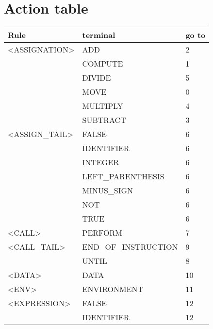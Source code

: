 \newpage\cleardoublepage{}
\section{Action table}
\label{app:action table}



\begin{longtable}{|l|l|l|}

\hline

\textbf{Rule}        &   \textbf{terminal}    &   \textbf{go to} \\ \hline 
<ASSIGNATION>        &   ADD                  &   2 \\ \hline
                     &   COMPUTE              &   1 \\ \hline
                     &   DIVIDE               &   5 \\ \hline
                     &   MOVE                 &   0 \\ \hline
                     &   MULTIPLY             &   4 \\ \hline
                     &   SUBTRACT             &   3 \\ \hline
<ASSIGN\_TAIL>       &   FALSE                &   6 \\ \hline
                     &   IDENTIFIER           &   6 \\ \hline
                     &   INTEGER              &   6 \\ \hline
                     &   LEFT\_PARENTHESIS     &   6 \\ \hline
                     &   MINUS\_SIGN           &   6 \\ \hline
                     &   NOT                  &   6 \\ \hline
                     &   TRUE                 &   6 \\ \hline
<CALL>               &   PERFORM              &   7 \\ \hline
<CALL\_TAIL>         &   END\_OF\_INSTRUCTION   &   9 \\ \hline
                     &   UNTIL                &   8 \\ \hline
<DATA>               &   DATA                 &   10 \\ \hline
<ENV>                &   ENVIRONMENT          &   11 \\ \hline
<EXPRESSION>         &   FALSE                &   12 \\ \hline
                     &   IDENTIFIER           &   12 \\ \hline

\end{longtable}
